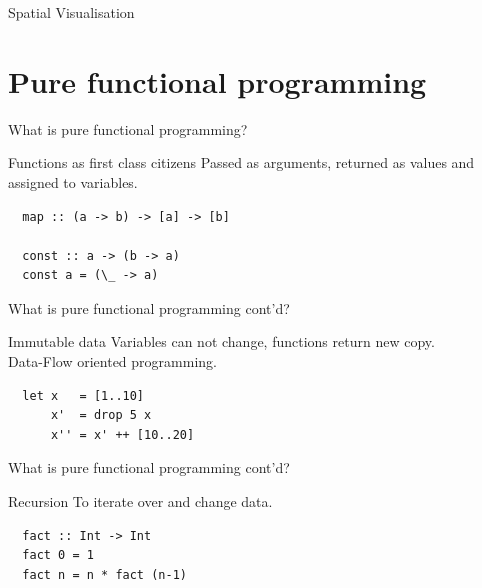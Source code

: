 \documentclass{beamer}
\begin{document}
\begin{frame}{Spatial Visualisation}
\end{frame}

\section{Pure functional programming}
\begin{frame}[fragile]{What is pure functional programming?}
  \begin{block}{Functions as first class citizens}
  	Passed as arguments, returned as values and assigned to variables.
  \end{block}
  
  \begin{block}{}
  \begin{verbatim}
  map :: (a -> b) -> [a] -> [b]
	
  const :: a -> (b -> a)
  const a = (\_ -> a)
  \end{verbatim}
  \end{block}
\end{frame}
 
\begin{frame}[fragile]{What is pure functional programming cont'd?}
  \begin{block}{Immutable data}
 	Variables can not change, functions return new copy. \\ Data-Flow oriented programming.
  \end{block}
  
  \begin{block}{}
  \begin{verbatim}
  let x   = [1..10]
      x'  = drop 5 x
      x'' = x' ++ [10..20] 
  \end{verbatim}
  \end{block}
\end{frame}
 
\begin{frame}[fragile]{What is pure functional programming cont'd?}
  \begin{block}{Recursion}
 	To iterate over and change data. 
  \end{block}
  
  \begin{block}{}
  \begin{verbatim}
  fact :: Int -> Int
  fact 0 = 1
  fact n = n * fact (n-1)
  \end{verbatim}
  \end{block}
\end{frame}
 
\end{document}
